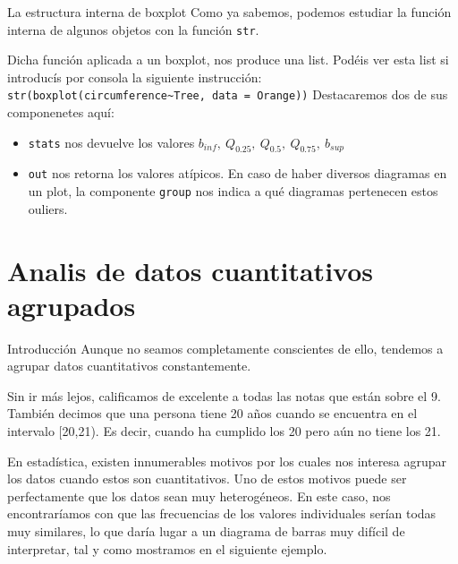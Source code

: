 \documentclass[
  ignorenonframetext,
]{beamer}
\providecommand{\tightlist}{%
  \setlength{\itemsep}{0pt}\setlength{\parskip}{0pt}}
\begin{document}
\begin{frame}[fragile]{La estructura interna de boxplot}
\label{la-estructura-interna-de-boxplot}
Como ya sabemos, podemos estudiar la función interna de algunos objetos
con la función \texttt{str}.

Dicha función aplicada a un boxplot, nos produce una list. Podéis ver
esta list si introducís por consola la siguiente instrucción:
\texttt{str(boxplot(circumference\textasciitilde{}Tree,\ data\ =\ Orange))}
Destacaremos dos de sus componenetes aquí:

\begin{itemize}
\tightlist
\item
  \texttt{stats} nos devuelve los valores
  \(b_{inf},\ Q_{0.25},\ Q_{0.5},\ Q_{0.75},\ b_{sup}\)
\item
  \texttt{out} nos retorna los valores atípicos. En caso de haber
  diversos diagramas en un plot, la componente \texttt{group} nos indica
  a qué diagramas pertenecen estos ouliers.
\end{itemize}
\end{frame}

\section{Analis de datos cuantitativos
agrupados}\label{analis-de-datos-cuantitativos-agrupados}

\begin{frame}{Introducción}
\label{introducciuxf3n-1}
Aunque no seamos completamente conscientes de ello, tendemos a agrupar
datos cuantitativos constantemente.

Sin ir más lejos, calificamos de excelente a todas las notas que están
sobre el 9. También decimos que una persona tiene 20 años cuando se
encuentra en el intervalo {[}20,21). Es decir, cuando ha cumplido los 20
pero aún no tiene los 21.

En estadística, existen innumerables motivos por los cuales nos interesa
agrupar los datos cuando estos son cuantitativos. Uno de estos motivos
puede ser perfectamente que los datos sean muy heterogéneos. En este
caso, nos encontraríamos con que las frecuencias de los valores
individuales serían todas muy similares, lo que daría lugar a un
diagrama de barras muy difícil de interpretar, tal y como mostramos en
el siguiente ejemplo.
\end{frame}
\end{document}
